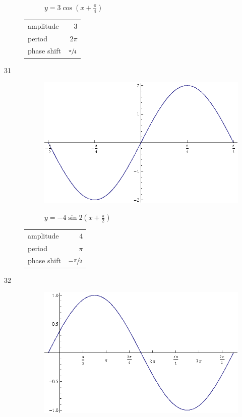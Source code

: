 \documentclass{exam}
\begin{document}
\begin{description}
\begin{figure}[H]
          $y = 3 \cos \left( x + \frac{\pi}{4} \right)$
        \end{figure}

        \begin{tabular}[H]{lr}
          \toprule
          amplitude   & $3$ \\
          period      & $2 \pi$ \\
          phase shift & $\sfrac{\pi}{4}$ \\
          \bottomrule
        \end{tabular}

      \item[31]
        \begin{figure}[H]
          \centering
          \includegraphics[scale=0.8]{exercise31.eps}

          $y = -4 \sin 2 \left( x + \frac{\pi}{2} \right)$
        \end{figure}

        \begin{tabular}[H]{lr}
          \toprule
          amplitude   & $4$ \\
          period      & $\pi$ \\
          phase shift & $- \sfrac{\pi}{2}$ \\
          \bottomrule
        \end{tabular}

      \item[32]
        \begin{figure}[H]
          \centering
          \includegraphics[scale=0.8]{exercise32.eps}


\end{figure}
\end{description}
\end{document}
